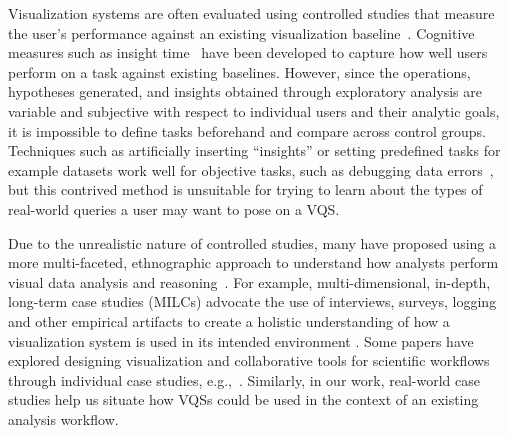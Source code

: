 \par Visualization systems are often evaluated using controlled studies that measure the user's performance against an existing visualization baseline~\cite{Plaisant2004}. Cognitive measures such as insight time~\cite{North2006,Yi2008} have been developed to capture how well users perform on a task against existing baselines. However, since the operations, hypotheses generated, and insights obtained through exploratory analysis are variable and subjective with respect to individual users and their analytic goals, it is impossible to define tasks beforehand and compare across control groups. Techniques such as artificially inserting ``insights'' or setting predefined tasks for example datasets work well for objective tasks, such as debugging data errors~\cite{kandel2011wrangler,Patel2010}, but this contrived method is unsuitable for trying to learn about the types of real-world queries a user may want to pose on a VQS. 
\par Due to the unrealistic nature of controlled studies, many have proposed using a more multi-faceted, ethnographic approach to understand how analysts perform visual data analysis and reasoning~\cite{Plaisant2004,lam2012empirical,shneiderman2006strategies,munzner2009nested,Sedlmair2012}. For example, multi-dimensional, in-depth, long-term case studies (MILCs) advocate the use of interviews, surveys, logging and other empirical artifacts to create a holistic understanding of how a visualization system is used in its intended environment \cite{shneiderman2006strategies}. Some papers have explored designing visualization and collaborative tools for scientific workflows through individual case studies, e.g.,~\cite{Poon2008,Chen2016}. Similarly, in our work, real-world case studies help us situate how VQSs could be used in the context of an existing analysis workflow.  
